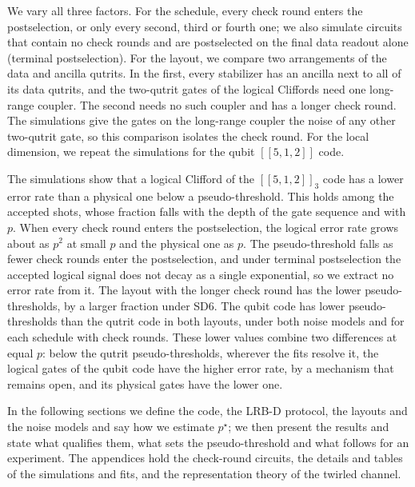 We vary all three factors. For the schedule, every check round enters the postselection, or only every second, third or fourth one; we also simulate circuits that contain no check rounds and are postselected on the final data readout alone (terminal postselection). For the layout, we compare two arrangements of the data and ancilla qutrits. In the first, every stabilizer has an ancilla next to all of its data qutrits, and the two-qutrit gates of the logical Cliffords need one long-range coupler. The second needs no such coupler and has a longer check round. The simulations give the gates on the long-range coupler the noise of any other two-qutrit gate, so this comparison isolates the check round. For the local dimension, we repeat the simulations for the qubit $[[5,1,2]]$ code.

The simulations show that a logical Clifford of the $[[5,1,2]]_3$ code has a lower error rate than a physical one below a pseudo-threshold. This holds among the accepted shots, whose fraction falls with the depth of the gate sequence and with $p$. When every check round enters the postselection, the logical error rate grows about as $p^2$ at small $p$ and the physical one as $p$. The pseudo-threshold falls as fewer check rounds enter the postselection, and under terminal postselection the accepted logical signal does not decay as a single exponential, so we extract no error rate from it. The layout with the longer check round has the lower pseudo-thresholds, by a larger fraction under SD6. The qubit code has lower pseudo-thresholds than the qutrit code in both layouts, under both noise models and for each schedule with check rounds. These lower values combine two differences at equal $p$: below the qutrit pseudo-thresholds, wherever the fits resolve it, the logical gates of the qubit code have the higher error rate, by a mechanism that remains open, and its physical gates have the lower one.

In the following sections we define the code, the LRB-D protocol, the layouts and the noise models and say how we estimate $p^\star$; we then present the results and state what qualifies them, what sets the pseudo-threshold and what follows for an experiment. The appendices hold the check-round circuits, the details and tables of the simulations and fits, and the representation theory of the twirled channel.
